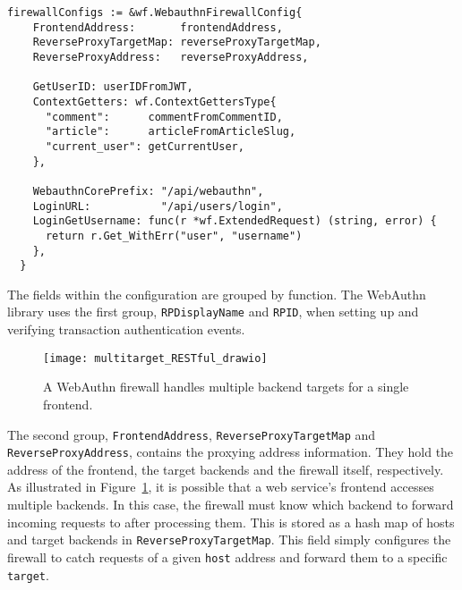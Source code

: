 \begin{lstlisting}[float=h]
  firewallConfigs := &wf.WebauthnFirewallConfig{
    FrontendAddress:       frontendAddress,
    ReverseProxyTargetMap: reverseProxyTargetMap,
    ReverseProxyAddress:   reverseProxyAddress,

    GetUserID: userIDFromJWT,
    ContextGetters: wf.ContextGettersType{
      "comment":      commentFromCommentID,
      "article":      articleFromArticleSlug,
      "current_user": getCurrentUser,
    },

    WebauthnCorePrefix: "/api/webauthn",
    LoginURL:           "/api/users/login",
    LoginGetUsername: func(r *wf.ExtendedRequest) (string, error) {
      return r.Get_WithErr("user", "username")
    },
  }
\end{lstlisting}

The fields within the configuration are grouped by function. The WebAuthn library uses the first group, \lstinline{RPDisplayName} and \lstinline{RPID}, when setting up and verifying transaction authentication events. 

\begin{figure}[h]
  \centering
  \texttt{[image: multitarget\_RESTful\_drawio]}
  \caption{A WebAuthn firewall handles multiple backend targets for a single frontend.}
  \label{Fig:MultiTargetRESTful}
\end{figure}

The second group, \lstinline{FrontendAddress}, \lstinline{ReverseProxyTargetMap} and \lstinline{ReverseProxyAddress}, contains the proxying address information. They hold the address of the frontend, the target backends and the firewall itself, respectively. As illustrated in Figure~\ref{Fig:MultiTargetRESTful}, it is possible that a web service's frontend accesses multiple backends. In this case, the firewall must know which backend to forward incoming requests to after processing them. This is stored as a hash map of hosts and target backends in \lstinline{ReverseProxyTargetMap}. This field simply configures the firewall to catch requests of a given \lstinline{host} address and forward them to a specific \lstinline{target}.


